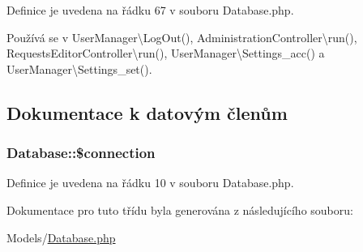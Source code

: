Definice je uvedena na řádku 67 v souboru Database.\-php.



Používá se v User\-Manager\textbackslash{}\-Log\-Out(), Administration\-Controller\textbackslash{}run(), Requests\-Editor\-Controller\textbackslash{}run(), User\-Manager\textbackslash{}\-Settings\-\_\-acc() a User\-Manager\textbackslash{}\-Settings\-\_\-set().



\subsection{Dokumentace k datovým členům}
\hypertarget{class_database_a6c6ec1bb30526f5e9a2d5ccfd6dbcc2b}{
\subsubsection[{\$connection}]{\setlength{\rightskip}{0pt plus 5cm}Database\-::\$connection\hspace{0.3cm}{\ttfamily [static]}}}\label{class_database_a6c6ec1bb30526f5e9a2d5ccfd6dbcc2b}


Definice je uvedena na řádku 10 v souboru Database.\-php.



Dokumentace pro tuto třídu byla generována z následujícího souboru\-:\begin{DoxyCompactItemize}
\item 
Models/\hyperlink{_database_8php}{Database.\-php}\end{DoxyCompactItemize}
